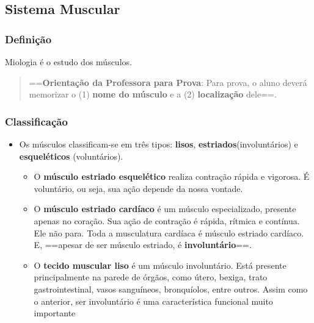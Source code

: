\documentclass[
]{book}
\providecommand{\tightlist}{%
  \setlength{\itemsep}{0pt}\setlength{\parskip}{0pt}}
\begin{document}
\hypertarget{sistema-muscular}{%
\subsection{Sistema Muscular}\label{sistema-muscular}}

\hypertarget{definiuxe7uxe3o-1}{%
\subsubsection{Definição}\label{definiuxe7uxe3o-1}}

Miologia é o estudo dos músculos.

\begin{quote}
==\textbf{Orientação da Professora para Prova}: Para prova, o aluno deverá memorizar o (1) \textbf{nome do músculo} e a (2) \textbf{localização} dele==.
\end{quote}

\hypertarget{classificauxe7uxe3o}{%
\subsubsection{Classificação}\label{classificauxe7uxe3o}}

\begin{itemize}
\tightlist
\item
  Os músculos classificam-se em três tipos: \textbf{lisos}, \textbf{estriados}(involuntários) e \textbf{esqueléticos} (voluntários).

  \begin{itemize}
  \tightlist
  \item
    O \textbf{músculo estriado esquelético} realiza contração rápida e vigorosa. É voluntário, ou seja, sua ação depende da nossa vontade.
  \item
    O \textbf{músculo estriado cardíaco} é um músculo especializado, presente apenas no coração. Sua ação de contração é rápida, rítmica e contínua. Ele não para. Toda a musculatura cardíaca é músculo estriado cardíaco. E, ==apesar de ser músculo estriado, é \textbf{involuntário}==.
  \item
    O \textbf{tecido muscular liso} é um músculo involuntário. Está presente principalmente na parede de órgãos, como útero, bexiga, trato gastrointestinal, vasos sanguíneos, bronquíolos, entre outros. Assim como o anterior, ser involuntário é uma característica funcional muito importante
  \end{itemize}
\end{itemize}
\end{document}
